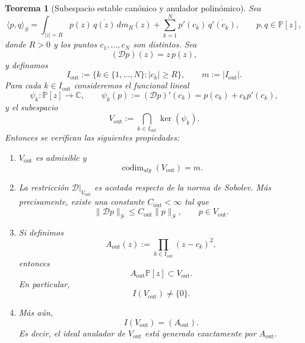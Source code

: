 \documentclass[12pt,a4paper]{article}
\newtheorem{theorem}{Teorema}
\theoremstyle{definition}
\theoremstyle{remark}
\begin{document}
\begin{theorem}[Subespacio estable canónico y anulador polinómico]
	\label{thm:Vout_anulador}
	Sea
	\[
		\langle p,q\rangle_S
		=
		\int_{|z|=R} p(z)\,\overline{q(z)}\,dm_R(z)
		+
		\sum_{k=1}^N p'(c_k)\,\overline{q'(c_k)},
		\qquad p,q\in \mathbb P[z],
	\]
	donde $R>0$ y los puntos $c_1,\dots,c_N$ son distintos. Sea
	\[
		(\mathcal D p)(z)=z\,p(z),
	\]
	y definamos
	\[
		I_{\mathrm{out}}:=\{k\in\{1,\dots,N\}: |c_k|\ge R\},
		\qquad
		m:=|I_{\mathrm{out}}|.
	\]
	Para cada $k\in I_{\mathrm{out}}$ consideremos el funcional lineal
	\[
		\psi_k:\mathbb P[z]\to\mathbb C,
		\qquad
		\psi_k(p):=(\mathcal D p)'(c_k)=p(c_k)+c_kp'(c_k),
	\]
	y el subespacio
	\[
		V_{\mathrm{out}}:=\bigcap_{k\in I_{\mathrm{out}}}\ker(\psi_k).
	\]
	Entonces se verifican las siguientes propiedades:

	\begin{enumerate}
		\item $V_{\mathrm{out}}$ es admisible y
		      \[
			      \operatorname{codim}_{alg}(V_{\mathrm{out}})=m.
		      \]

		\item La restricción $\mathcal D|_{V_{\mathrm{out}}}$ es acotada respecto de la norma
		      de Sobolev. Más precisamente, existe una constante $C_{\mathrm{out}}<\infty$ tal que
		      \[
			      \|\mathcal D p\|_S\le C_{\mathrm{out}}\|p\|_S,
			      \qquad p\in V_{\mathrm{out}}.
		      \]

		\item Si definimos
		      \[
			      A_{\mathrm{out}}(z):=\prod_{k\in I_{\mathrm{out}}}(z-c_k)^2,
		      \]
		      entonces
		      \[
			      A_{\mathrm{out}}\mathbb P[z]\subset V_{\mathrm{out}}.
		      \]
		      En particular,
		      \[
			      I(V_{\mathrm{out}})\neq \{0\}.
		      \]

		\item Más aún,
		      \[
			      I(V_{\mathrm{out}})=(A_{\mathrm{out}}).
		      \]
		      Es decir, el ideal anulador de $V_{\mathrm{out}}$ está generado exactamente por
		      $A_{\mathrm{out}}$.
	\end{enumerate}
\end{theorem}
\end{document}

